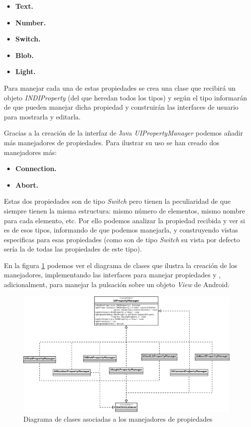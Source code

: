 \begin{itemize}
  \item \textbf{Text.}
  \item \textbf{Number.}
  \item \textbf{Switch.}
  \item \textbf{Blob.}
  \item \textbf{Light.}
\end{itemize}

\bigskip
Para manejar cada una de estas propiedades se crea una clase que recibirá un objeto \textit{INDIProperty} (del que heredan todos los tipos) y según el tipo informarán de que pueden manejar dicha propiedad y construirán las interfaces de usuario para mostrarla y editarla.

\bigskip
Gracias a la creación de la interfaz de Java \textit{UIPropertyManager} podemos añadir más manejadores de propiedades. Para ilustrar su uso se han creado dos manejadores más:

\begin{itemize}
  \item \textbf{Connection.}
  \item \textbf{Abort.}
\end{itemize}

\bigskip
Estas dos propiedades son de tipo \textit{Switch} pero tienen la peculiaridad de que siempre tienen la misma estructura: mismo número de elementos, mismo nombre para cada elemento, etc. Por ello podemos analizar la propiedad recibida y ver si es de esos tipos, informando de que podemos manejarla, y construyendo vistas especificas para esas propiedades (como son de tipo \textit{Switch} su vista por defecto sería la de todas las propiedades de este tipo).

\bigskip
En la figura \ref{fig:diag_manager_ui} podemos ver el diagrama de clases que ilustra la creación de los manejadores, implementando las interfaces para manejar propiedades y , adicionalment, para manejar la pulsación sobre un objeto \textit{View} de Android.

\bigskip
\begin{figure}[!ht]
  \begin{center}
  \includegraphics[width=1\textwidth]{../images/manager_ui.png}
  \caption{Diagrama de clases asociadas a los manejadores de propiedades}
  \label{fig:diag_manager_ui}
  \end{center}
\end{figure}

